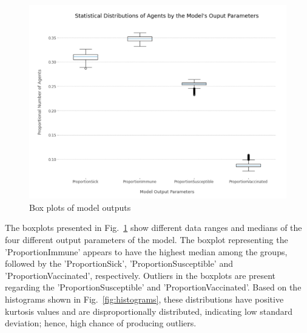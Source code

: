 \documentclass[smallextended]{svjour3}       %
\begin{document}


\begin{figure}
	\centering
	\includegraphics[width=\linewidth]{figures/agentTypeDistrib.png}
	\caption{Box plots of model outputs\label{fig:agenttypedistrib}}
\end{figure}


The boxplots presented in Fig.~\ref{fig:agenttypedistrib} show different data ranges and medians of the four different output parameters of the model. The boxplot representing the 'ProportionImmune' appears to have the highest median among the groups, followed by the 'ProportionSick', 'ProportionSusceptible' and 'ProportionVaccinated', respectively. Outliers in the boxplots are present regarding the 'ProportionSusceptible' and 'ProportionVaccinated'. Based on the histograms shown in Fig.~\ref{fig:histograms}, these distributions have positive kurtosis values and are disproportionally distributed, indicating low standard deviation; hence, high chance of producing outliers.
\end{document}
